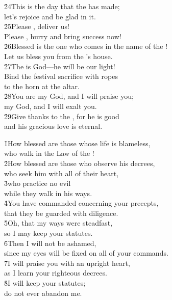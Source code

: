 \begin{poetry}
\poeml \v{24}This is the day that the  has made; \\
\poemll    let's rejoice and be glad in it. \\
\poeml \v{25}Please , deliver us! \\
\poemll    Please , hurry and bring success now! \\
\poeml \v{26}Blessed is the one who comes in the name of the ! \\
\poemll    Let us bless you from the 's house. \\
\poeml \v{27}The  is God---he will be our light! \\
\poemll    Bind the festival sacrifice with ropes \\
\poemlll       to the horn at the altar. \\
\poeml \v{28}You are my God, and I will praise you; \\
\poemll    my God, and I will exalt you. \\
\poeml \v{29}Give thanks to the , for he is good \\
\poemll    and his gracious love is eternal.
\end{poetry}

\begin{poetry}
\poeml \v{1}How blessed are those whose life is blameless, \\
\poemll    who walk in the Law of the ! \\
\poeml \v{2}How blessed are those who observe his decrees, \\
\poemll    who seek him with all of their heart, \\
\poeml \v{3}who practice no evil \\
\poemll    while they walk in his ways. \\
\poeml \v{4}You have commanded concerning your precepts, \\
\poemll    that they be guarded with diligence. \\
\poeml \v{5}Oh, that my ways were steadfast, \\
\poemll    so I may keep your statutes. \\
\poeml \v{6}Then I will not be ashamed, \\
\poemll    since my eyes will be fixed on all of your commands. \\
\poeml \v{7}I will praise you with an upright heart, \\
\poemll    as I learn your righteous decrees. \\
\poeml \v{8}I will keep your statutes; \\
\poemll    do not ever abandon me.
\end{poetry}

